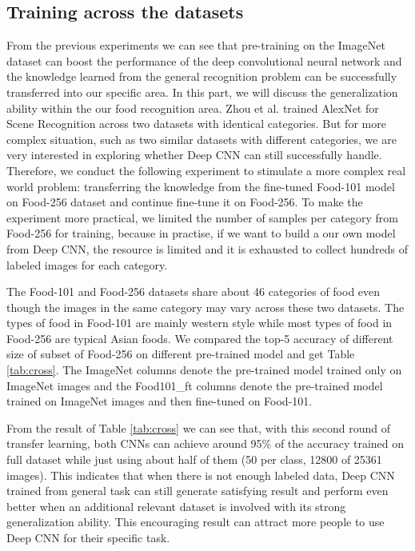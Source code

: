 \subsection{Training across the datasets}
From the previous experiments we can see that pre-training on the ImageNet dataset can boost the performance of the deep convolutional neural network and the knowledge learned from the general recognition problem can be successfully transferred into our specific area. In this part, we will discuss the generalization ability within the our food recognition area.  Zhou et al. trained AlexNet for Scene Recognition across two datasets with identical categories\cite{NIPS2014_Zhou}. But for more complex situation, such as two similar datasets with different categories, we are very interested in exploring whether Deep CNN can still successfully handle. Therefore, we conduct the following experiment to stimulate a more complex real world problem: transferring the knowledge from the fine-tuned Food-101 model on Food-256 dataset and continue fine-tune it on Food-256. To make the experiment more practical, we limited the number of samples per category from Food-256 for training, because in practise, if we want to build a our own model from Deep CNN, the resource is limited and it is exhausted to collect hundreds of labeled images for each category.

The Food-101 and Food-256 datasets share about 46 categories of food even though the images in the same category may vary across these two datasets. The types of food in Food-101 are mainly western style while most types of food in Food-256 are typical Asian foods. We compared the top-5 accuracy of different size of subset of Food-256 on different pre-trained model and get Table \ref{tab:cross}. The ImageNet columns denote the pre-trained model trained only on ImageNet images and the Food101\_ft columns denote the pre-trained model trained on ImageNet images and then fine-tuned on Food-101. 

From the result of Table \ref{tab:cross} we can see that, with this second round of transfer learning, both CNNs can achieve around 95\% of the accuracy trained on full dataset while just using about half of them (50 per class, 12800 of 25361 images). This indicates that when there is not enough labeled data, Deep CNN trained from general task can still generate satisfying result and perform even better when an additional relevant dataset is involved with its strong generalization ability. This encouraging result can attract more people to use Deep CNN for their specific task.

